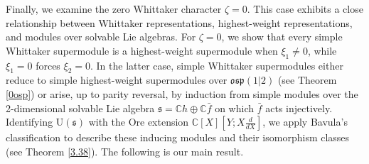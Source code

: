 \documentclass[a4paper,10pt]{article}
\theoremstyle{definition}
\theoremstyle{plain}
\theoremstyle{remark}
\theoremstyle{mystyle}
\numberwithin{equation}{section}
\begin{document}
Finally, we examine the zero Whittaker character $\zeta=0$. This case exhibits a close relationship between Whittaker representations, highest-weight representations, and modules over solvable Lie algebras. For $\zeta=0$, we show that every simple Whittaker supermodule is a highest-weight supermodule when $\xi_1\neq0$, while $\xi_1=0$ forces $\xi_2=0$. In the latter case, simple Whittaker supermodules either reduce to simple highest-weight supermodules over $\mathfrak{osp}(1|2)$ (see Theorem \ref{0osp}) or arise, up to parity reversal, by induction from simple modules over the 2-dimensional solvable Lie algebra $\mathfrak s=\mathbb Ch\oplus\mathbb C\bar f$ on which $\bar f$ acts injectively. Identifying $\mathrm U(\mathfrak s)$ with the Ore extension $\mathbb C[X][Y;X\frac{d}{dX}]$, we apply Bavula's classification \cite{Bavula2020} to describe these inducing modules and their isomorphism classes (see Theorem \ref{3.38}). The following is our main result.
\end{document}

